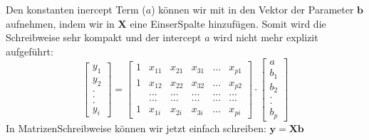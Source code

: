 \documentclass[letterpaper,10pt,english]{jupyterBook}
\begin{document}
\sphinxAtStartPar
Den konstanten inercept Term (\(a\)) können wir mit in den Vektor der Parameter \(\mathbf{b}\) aufnehmen, indem wir in \(\mathbf{X}\) eine Einser\sphinxhyphen{}Spalte hinzufügen. Somit wird die Schreibweise sehr kompakt und der intercept \(a\) wird nicht mehr explizit aufgeführt:
\begin{equation*}
     \begin{bmatrix}
      y_1\\
      y_2\\
      .  \\
      .  \\
      .  \\
      y_i
    \end{bmatrix}
    =
    \begin{bmatrix}
      1& x_{11} & x_{21} & x_{31} & \ldots & x_{p1}\\
      1 &  x_{12} & x_{22} & x_{32} & \ldots & x_{p2}\\
      &\ldots&\ldots&\ldots&\ldots&\ldots\\
      &\ldots&\ldots&\ldots&\ldots&\ldots\\
      1& x_{1i} & x_{2i} & x_{3i} & \ldots & x_{pi}
    \end{bmatrix}
    \cdot
    \begin{bmatrix}
      a\\
      b_1\\
      b_2\\
      .\\
      .\\
      b_p
    \end{bmatrix}
  \end{equation*}
\sphinxAtStartPar
In Matrizen\sphinxhyphen{}Schreibweise können wir jetzt einfach schreiben:
\(\mathbf{y} = \mathbf{X}\mathbf{b}\)
\end{document}
